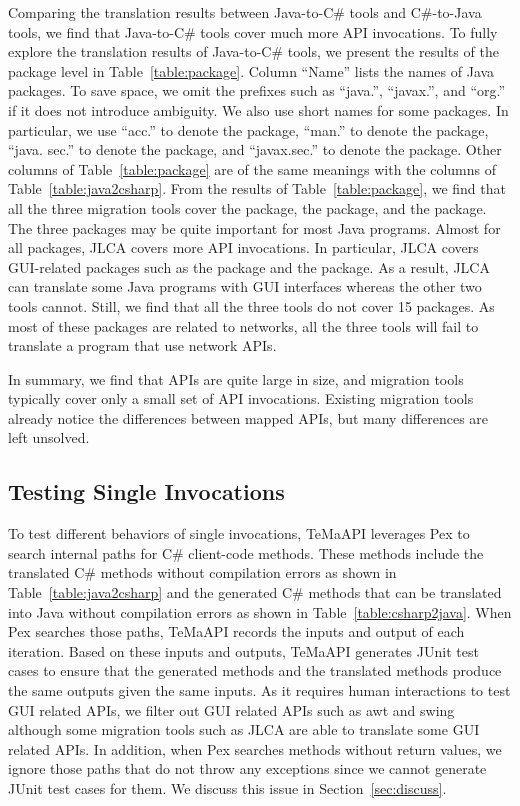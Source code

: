 Comparing the translation results between Java-to-C\# tools and C\#-to-Java tools, we find that Java-to-C\# tools cover much more API invocations. To fully explore the translation results of Java-to-C\# tools, we present the results of the package level in Table~\ref{table:package}. Column ``Name'' lists the names of Java packages. To save space, we omit the prefixes such as ``java.'', ``javax.'', and ``org.'' if it does not introduce ambiguity. We also use short names for some packages. In particular, we use ``acc.'' to denote the  package, ``man.'' to denote the  package, ``java. sec.'' to denote the  package, and ``javax.sec.'' to denote the  package. Other columns of Table~\ref{table:package} are of the same meanings with the columns of Table~\ref{table:java2csharp}. From the results of Table~\ref{table:package}, we find that all the three migration tools cover the  package, the  package, and the  package. The three packages may be quite important for most Java programs. Almost for all packages, JLCA covers more API invocations. In particular, JLCA covers GUI-related packages such as the  package and the  package. As a result, JLCA can translate some Java programs with GUI interfaces whereas the other two tools cannot. Still, we find that all the three tools do not cover 15 packages. As most of these packages are related to networks, all the three tools will fail to translate a program that use network APIs.


In summary, we find that APIs are quite large in size, and migration tools typically cover only a small set of API invocations. Existing migration tools already notice the differences between mapped APIs, but many differences are left unsolved.
\subsection{Testing Single Invocations}
\label{sec:evaluation:single}


To test different behaviors of single invocations, TeMaAPI leverages Pex to search internal paths for C\# client-code methods. These methods include the translated C\# methods without compilation errors as shown in Table~\ref{table:java2csharp} and the generated C\# methods that can be translated into Java without compilation errors as shown in Table~\ref{table:csharp2java}. When Pex searches those paths, TeMaAPI records the inputs and output of each iteration. Based on these inputs and outputs, TeMaAPI generates JUnit test cases to ensure that the generated methods and the translated methods produce the same outputs given the same inputs. As it requires human interactions to test GUI related APIs, we filter out GUI related APIs such as awt and swing although some migration tools such as JLCA are able to translate some GUI related APIs. In addition, when Pex searches methods without return values, we ignore those paths that do not throw any exceptions since we cannot generate JUnit test cases for them. We discuss this issue in Section~\ref{sec:discuss}.


